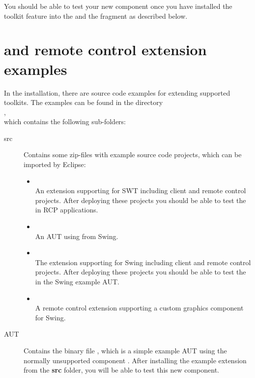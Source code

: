 You should be able to test your new component once you have installed the
toolkit feature into the \ite{} and the fragment as described below.

\section{\ite{} and remote control extension examples}
\label{extensionExamples}

In the installation, there are source code examples for extending supported toolkits. The
examples can be found in the directory\\
,\\
which contains the following sub-folders:

\begin{description}
 \item[src] Contains some zip-files with example source code projects, which
            can be imported by Eclipse:
 \begin{itemize}
   \item {}\\
         An extension supporting  for SWT including client
         and remote control projects. After deploying these projects you should
         be able to test the  in RCP applications.
   \item {}\\
         An AUT using  from Swing.
   \item {}\\
         The  extension supporting  for Swing including
         client and remote control projects. After deploying these projects you
         should be able to test the  in the Swing example AUT.
   \item {}\\
         A remote control extension supporting a custom graphics
         component for Swing.
 \end{itemize}
 \item[AUT]  Contains the binary file , which is a simple
 example AUT using the normally unsupported component . After
 installing the  example extension from the \textbf{src}
 folder, you will be able to test this new component.
\end{description}
